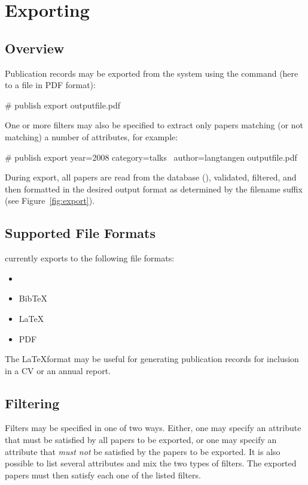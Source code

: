 \chapter{Exporting}
\label{export}

\section{Overview}

Publication records may be exported from the system using the  command
(here to a file in PDF format):
\begin{code}
# publish export outputfile.pdf
\end{code}

One or more filters may also be specified to extract only papers
matching (or not matching) a number of attributes, for example:
\begin{code}
# publish export year=2008 category=talks \
  author=langtangen outputfile.pdf
\end{code}

During export, all papers are read from the database
(), validated, filtered, and then formatted in the
desired output format as determined by the filename suffix (see
Figure~\ref{fig:export}).

\section{Supported File Formats}

\package{} currently exports to the following file formats:
\begin{itemize}
  \item
  \item
    BibTeX
  \item
    \LaTeX
  \item
    PDF
\end{itemize}

The \LaTeX format may be useful for generating publication records
for inclusion in a CV or an annual report.

\section{Filtering}

Filters may be specified in one of two ways. Either, one may
specify an attribute that must be satisfied by all papers to be
exported, or one may specify an attribute that \emph{must not} be
satisfied by the papers to be exported. It is also possible to list
several attributes and mix the two types of filters. The exported
papers must then satisfy each one of the listed filters.

